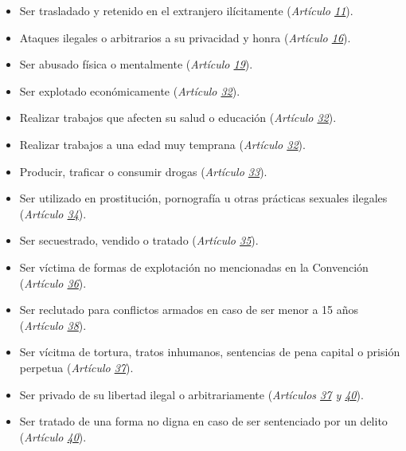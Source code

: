 \documentclass{tufte-handout}
\begin{document}
\begin{itemize}
\item{Ser trasladado y retenido en el extranjero ilícitamente (\textit{Artículo \href{https://procosi.github.io/nenes/convencion/?a=11}{11}}).}
\item{Ataques ilegales o arbitrarios a su privacidad y honra (\textit{Artículo \href{https://procosi.github.io/nenes/convencion/?a=16}{16}}).}
\item{Ser abusado física o mentalmente (\textit{Artículo \href{https://procosi.github.io/nenes/convencion/?a=19}{19}}).}
\item{Ser explotado económicamente (\textit{Artículo \href{https://procosi.github.io/nenes/convencion/?a=32}{32}}).}
\item{Realizar trabajos que afecten su salud o educación (\textit{Artículo \href{https://procosi.github.io/nenes/convencion/?a=32}{32}}).}
\item{Realizar trabajos a una edad muy temprana (\textit{Artículo \href{https://procosi.github.io/nenes/convencion/?a=32}{32}}).}
\item{Producir, traficar o consumir drogas (\textit{Artículo \href{https://procosi.github.io/nenes/convencion/?a=33}{33}}).}
\item{Ser utilizado en prostitución, pornografía u otras prácticas sexuales ilegales (\textit{Artículo \href{https://procosi.github.io/nenes/convencion/?a=34}{34}}).}
\item{Ser secuestrado, vendido o tratado (\textit{Artículo \href{https://procosi.github.io/nenes/convencion/?a=35}{35}}).}
\item{Ser víctima de formas de explotación no mencionadas en la Convención (\textit{Artículo \href{https://procosi.github.io/nenes/convencion/?a=36}{36}}).}
\item{Ser reclutado para conflictos armados en caso de ser menor a 15 años (\textit{Artículo \href{https://procosi.github.io/nenes/convencion/?a=38}{38}}).}
\item{Ser vícitma de tortura, tratos inhumanos, sentencias de pena capital o prisión perpetua (\textit{Artículo \href{https://procosi.github.io/nenes/convencion/?a=37}{37}}).}
\item{Ser privado de su libertad ilegal o arbitrariamente (\textit{Artículos \href{https://procosi.github.io/nenes/convencion/?a=37}{37} y \href{https://procosi.github.io/nenes/convencion/?a=40}{40}}).}
\item{Ser tratado de una forma no digna en caso de ser sentenciado por un delito (\textit{Artículo \href{https://procosi.github.io/nenes/convencion/?a=40}{40}}).}
\end{itemize}
\end{document}
